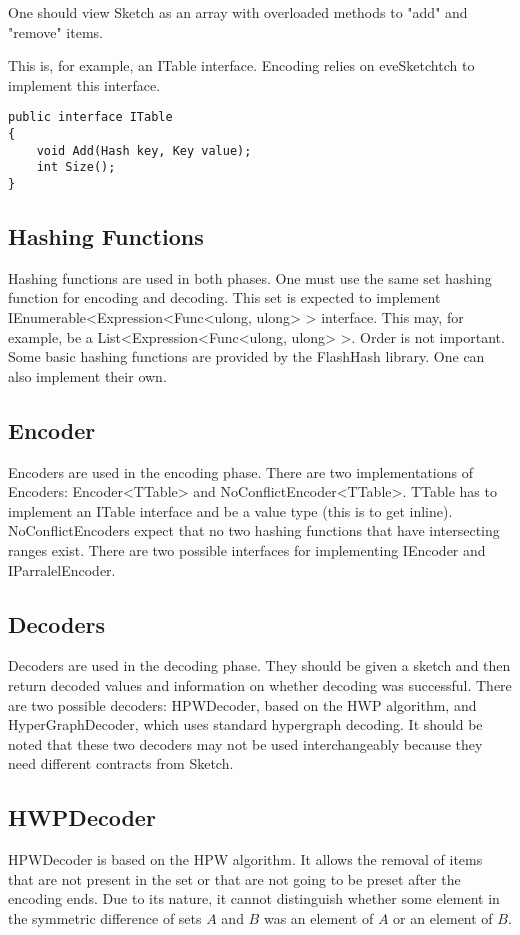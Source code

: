 One should view Sketch as an array with overloaded methods to "add" and "remove" items.

This is, for example, an ITable interface. Encoding relies on eveSketchtch to implement this interface. 
\begin{lstlisting}
public interface ITable
{
    void Add(Hash key, Key value);
    int Size();
}
\end{lstlisting}

\subsection{Hashing Functions}
Hashing functions are used in both phases. One must use the same set hashing function for encoding and decoding. This set is expected to implement IEnumerable<Expression<Func<ulong, ulong> > interface. This may, for example, be a List<Expression<Func<ulong, ulong> >. Order is not important. Some basic hashing functions are provided by the FlashHash library. One can also implement their own.

\subsection{Encoder}
Encoders are used in the encoding phase. There are two implementations of Encoders: Encoder<TTable> and NoConflictEncoder<TTable>. TTable has to implement an ITable interface and be a value type (this is to get inline). NoConflictEncoders expect that no two hashing functions that have intersecting ranges exist. There are two possible interfaces for implementing IEncoder and IParralelEncoder.

\subsection{Decoders}
Decoders are used in the decoding phase. They should be given a sketch and then return decoded values and information on whether decoding was successful. There are two possible decoders: HPWDecoder, based on the HWP algorithm, and HyperGraphDecoder, which uses standard hypergraph decoding. It should be noted that these two decoders may not be used interchangeably because they need different contracts from Sketch.

\subsection{HWPDecoder}
HPWDecoder is based on the HPW algorithm. It allows the removal of items that are not present in the set or that are not going to be preset after the encoding ends. Due to its nature, it cannot distinguish whether some element in the symmetric difference of sets $A$ and $B$ was an element of $A$ or an element of $B$.

